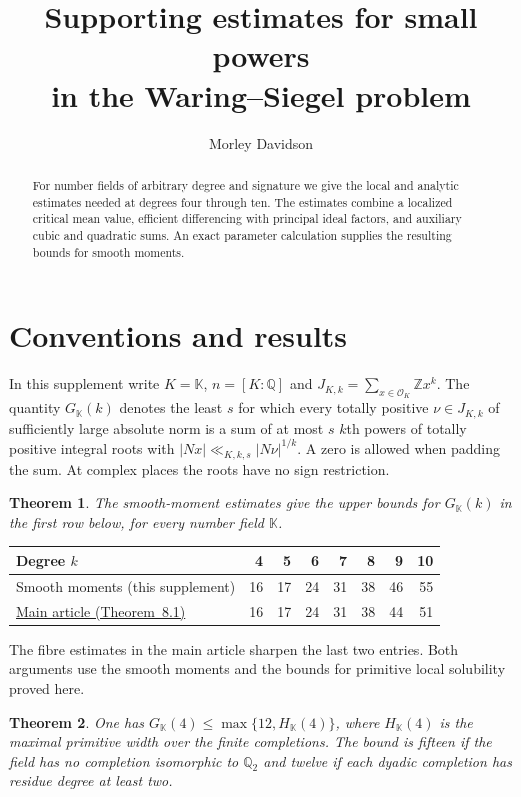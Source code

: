 \documentclass[11pt]{amsart}
\title[Supporting estimates for small powers]{Supporting estimates for small powers\\
in the Waring--Siegel problem}
\author{Morley Davidson}
\date{}
\newtheorem{theorem}{Theorem}[section]
\theoremstyle{definition}
\numberwithin{equation}{section}
\begin{document}
\begin{abstract}
For number fields of arbitrary degree and signature we give the local and analytic estimates needed at degrees four through ten. The estimates combine a localized critical mean value, efficient differencing with principal ideal factors, and auxiliary cubic and quadratic sums. An exact parameter calculation supplies the resulting bounds for smooth moments.
\end{abstract}
\maketitle
\raggedbottom
\tableofcontents
\section{Conventions and results}\label{sec:introduction}
In this supplement write $K=\mathbb K$, $n=[K:\mathbb Q]$ and
$J_{K,k}=\sum_{x\in\mathcal O_K}\mathbb Z x^k$.
The quantity $G_{\mathbb K}(k)$ denotes the least $s$ for which every
totally positive $\nu\in J_{K,k}$ of sufficiently large absolute norm is a
sum of at most $s$ $k$th powers of totally positive integral roots with
$|N x|\ll_{K,k,s}|N\nu|^{1/k}$. A zero is allowed when padding the sum.
At complex places the roots have no sign restriction.
\begin{theorem}\label{thm:main-transfer}
The smooth-moment estimates give the upper bounds for $G_{\mathbb K}(k)$
in the first row below, for every number field $\mathbb K$.
\end{theorem}
\begin{center}
\small
\begin{tabular}{lrrrrrrr}
\toprule
Degree $k$ & 4 & 5 & 6 & 7 & 8 & 9 & 10 \\
\midrule
Smooth moments (this supplement) & 16 & 17 & 24 & 31 & 38 & 46 & 55 \\
\href{https://raw.githubusercontent.com/morley988/warings-problem/main/manuscript/waring-siegel_preprint.pdf\#nameddest=theorem.8.1}{Main article (Theorem~8.1)} & 16 & 17 & 24 & 31 & 38 & 44 & 51 \\
\bottomrule
\end{tabular}
\end{center}
The fibre estimates in the main article sharpen the last two entries.
Both arguments use the smooth moments and the bounds for primitive
local solubility proved here.
\begin{theorem}\label{thm:quartic-refinements}
One has $G_{\mathbb K}(4)\le\max\{12,H_{\mathbb K}(4)\}$, where
$H_{\mathbb K}(4)$ is the maximal primitive width over the finite
completions. The bound is fifteen if the field has no completion
isomorphic to $\mathbb Q_2$ and twelve if each dyadic completion has
residue degree at least two.
\end{theorem}
\end{document}
